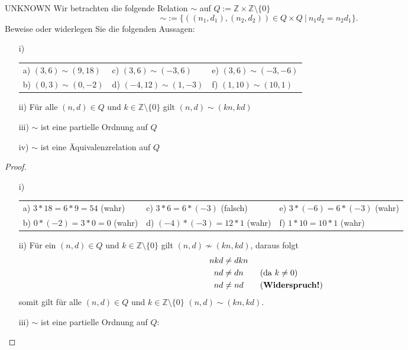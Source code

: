 \documentclass{problemset}
\begin{document}
\begin{problem}{UNKNOWN}
Wir betrachten die folgende Relation $\sim$ auf $Q := \mathbb{Z} \times \mathbb{Z}\setminus\{0\}$ \[
    \sim := \{((n_1,d_1),(n_2,d_2)) \in Q \times Q\ |\ n_1d_2 = n_2d_1\}.
\]
Beweise oder widerlegen Sie die folgenden Aussagen:
\begin{enumerate}
    \item [i)]
          \renewcommand{\arraystretch}{1.5}
          \begin{tabularx}{\textwidth}{ X X X }
              a) $(3,6) \sim (9,18)$ & c) $(3,6) \sim (-3, 6)$   & e) $(3, 6) \sim (-3, -6)$ \\
              b) $(0,3) \sim (0,-2)$ & d) $(-4,12) \sim (1, -3)$ & f) $(1, 10) \sim (10, 1)$
          \end{tabularx}
    \item [ii)] Für alle $(n,d) \in Q$ und $k \in \mathbb{Z}\setminus\{0\}$ gilt $(n,d) \sim (kn,kd)$
    \item [iii)] $\sim$ ist eine partielle Ordnung auf $Q$
    \item [iv)] $\sim$ ist eine Äquivalenzrelation auf $Q$
\end{enumerate}
\begin{proof} \ \newline
    \begin{enumerate}
        \item [i)]
              \renewcommand{\arraystretch}{1.5}
              \begin{tabularx}{\textwidth}{ X X X }
                  a) $3*18 = 6*9 = 54$ (wahr)  & c) $3*6 = 6*(-3)$ (falsch)  & e) $3*(-6) = 6 * (-3)$ (wahr) \\
                  b) $0*(-2) = 3*0 = 0$ (wahr) & d) $(-4)*(-3)= 12*1$ (wahr) & f) $1*10 = 10*1$ (wahr)
              \end{tabularx}
        \item [ii)] Für ein $(n,d) \in Q$ und $k \in \mathbb{Z}\setminus\{0\}$ gilt $(n,d) \not\sim (kn,kd)$, daraus folgt
              \begin{align}
                  nkd & \neq dkn                            \\
                  nd  & \neq dn \tag{da $k \neq 0$}         \\
                  nd  & \neq nd \tag{\textbf{Widerspruch!}}
              \end{align}
              somit gilt für alle $(n,d) \in Q$ und $k \in \mathbb{Z}\setminus\{0\}$ $(n,d) \sim (kn,kd)$.
        \item [iii)] $\sim$ ist eine partielle Ordnung auf $Q$: \newline

\end{enumerate}
\end{proof}
\end{problem}
\end{document}

